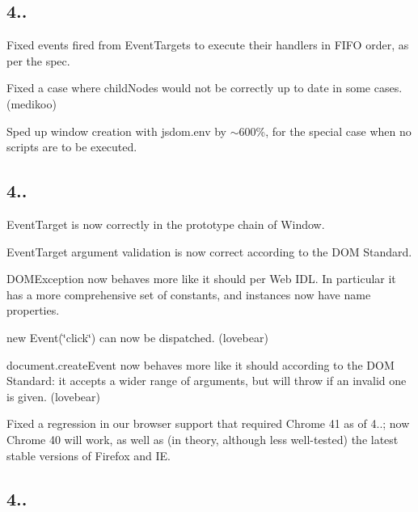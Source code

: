 \subsection*{4..}


\begin{DoxyItemize}
\item Fixed events fired from {\ttfamily Event\+Target}s to execute their handlers in F\+I\+FO order, as per the spec.
\item Fixed a case where {\ttfamily child\+Nodes} would not be correctly up to date in some cases. (medikoo)
\item Sped up window creation with {\ttfamily jsdom.\+env} by $\sim$600\%, for the special case when no scripts are to be executed.
\end{DoxyItemize}

\subsection*{4..}


\begin{DoxyItemize}
\item {\ttfamily Event\+Target} is now correctly in the prototype chain of {\ttfamily Window}.
\item {\ttfamily Event\+Target} argument validation is now correct according to the D\+OM Standard.
\item {\ttfamily D\+O\+M\+Exception} now behaves more like it should per Web I\+DL. In particular it has a more comprehensive set of constants, and instances now have {\ttfamily name} properties.
\item {\ttfamily new Event(\char`\"{}click\char`\"{})} can now be dispatched. (lovebear)
\item {\ttfamily document.\+create\+Event} now behaves more like it should according to the D\+OM Standard\+: it accepts a wider range of arguments, but will throw if an invalid one is given. (lovebear)
\item Fixed a regression in our browser support that required Chrome 41 as of 4..; now Chrome 40 will work, as well as (in theory, although less well-\/tested) the latest stable versions of Firefox and IE.
\end{DoxyItemize}

\subsection*{4..}


